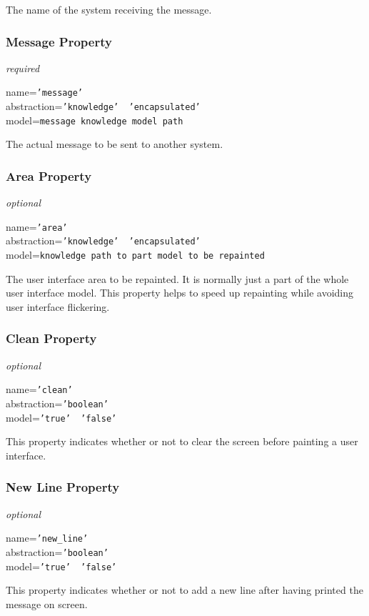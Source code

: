The name of the system receiving the message.

\subsubsection{Message Property}

\emph{required}

name=\texttt{'message'}\\
abstraction=\texttt{'knowledge' \vline\ 'encapsulated'}\\
model=\texttt{message knowledge model path}

The actual message to be sent to another system.

\subsubsection{Area Property}

\emph{optional}

name=\texttt{'area'}\\
abstraction=\texttt{'knowledge' \vline\ 'encapsulated'}\\
model=\texttt{knowledge path to part model to be repainted}

The user interface area to be repainted. It is normally just a part of the
whole user interface model. This property helps to speed up repainting while
avoiding user interface flickering.

\subsubsection{Clean Property}

\emph{optional}

name=\texttt{'clean'}\\
abstraction=\texttt{'boolean'}\\
model=\texttt{'true' \vline\ 'false'}

This property indicates whether or not to clear the screen before painting a
user interface.

\subsubsection{New Line Property}

\emph{optional}

name=\texttt{'new\_line'}\\
abstraction=\texttt{'boolean'}\\
model=\texttt{'true' \vline\ 'false'}

This property indicates whether or not to add a new line after having printed
the message on screen.
